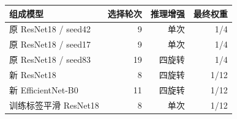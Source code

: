 \begin{tabular}{lrrr}
\toprule
组成模型 & 选择轮次 & 推理增强 & 最终权重 \\
\midrule
原 ResNet18 / seed42 & 9 & 单次 & 1/4 \\
原 ResNet18 / seed17 & 9 & 单次 & 1/4 \\
原 ResNet18 / seed83 & 19 & 四旋转 & 1/4 \\
新 ResNet18 & 8 & 四旋转 & 1/12 \\
新 EfficientNet-B0 & 11 & 四旋转 & 1/12 \\
训练标签平滑 ResNet18 & 8 & 单次 & 1/12 \\
\bottomrule
\end{tabular}